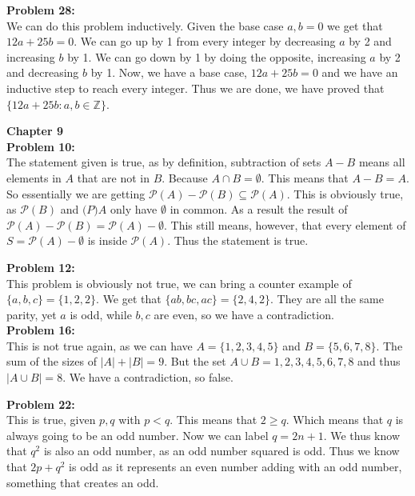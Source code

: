 \documentclass[12pt]{article}
\begin{document}
\noindent
\textbf{Problem 28:}\\

We can do this problem inductively. Given the base case $a, b = 0$ we get that $12a + 25b = 0$.
We can go up by 1 from every integer by decreasing $a$ by 2 and increasing
$b$ by 1. We can go down by 1 by doing the opposite, increasing $a$ by 2 and decreasing $b$ by 1. 
Now, we have a base case, $12a + 25b = 0$ and we have an inductive step to reach every integer. Thus we are done,
we have proved that $\{12a+25b:a,b\in\mathbb{Z}\}$.

\noindent 
\textbf{Chapter 9}\\



\noindent
\textbf{Problem 10:}\\
The statement given is true, as by definition, subtraction of sets $A-B$ means 
all elements in $A$ that are not in $B$. Because $A \cap B = \emptyset$. This means that $A-B = A$.
So essentially we are getting $\mathcal{P}(A) - \mathcal{P}(B) \subseteq \mathcal{P}(A)$.
This is obviously true, as $\mathcal{P}(B)$ and $\mathcal(P){A}$ only have $\emptyset$ in common.
As a result the result of $\mathcal{P}(A) - \mathcal{P}(B) = \mathcal{P}(A)-\emptyset$. 
This still means, however, that every element of $S = \mathcal{P}(A) - \emptyset$ is inside $\mathcal{P}(A)$.
Thus the statement is true.

\noindent
\textbf{Problem 12:}\\
This problem is obviously not true, we can bring a counter example of $\{a,b,c\} = \{1, 2, 2\}$. 
We get that $\{ab, bc, ac\} = \{2, 4, 2\}$. They are all the same parity, yet $a$ is odd, while $b, c$ are even, so we have a contradiction.\\

\noindent
\textbf{Problem 16:}\\
This is not true again, as we can have $A = \{1, 2, 3, 4, 5 \}$ and $B = \{5, 6, 7, 8\}$.
The sum of the sizes of $|A| + |B| = 9$. But the set $A \cup B = {1, 2, 3, 4, 5, 6, 7, 8}$
and thus $|A \cup B| = 8$. We have a contradiction, so false.

\noindent
\textbf{Problem 22:}\\
This is true, given $p, q$ with $p < q$. This means that $2 \ge q$. Which means that $q$ is always going to be an odd number.
Now we can label $q = 2n+1$. We thus know that $q^2$ is also an odd number, as an odd number squared is odd. Thus we know that $2p + q^2$ is odd
as it represents an even number adding with an odd number, something that creates an odd.
\end{document}
